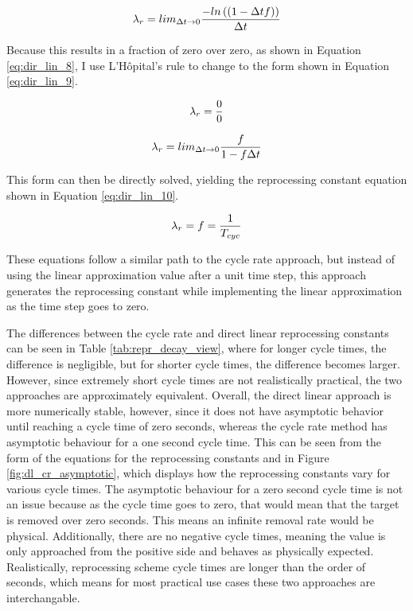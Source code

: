 \begin{equation} \hfill
\lambda_r = lim_{\Delta t \to 0} \frac{-ln\left((1 - \Delta t f)\right)}{\Delta t}
\hfill\label{eq:dir_lin_7} \end{equation}

Because this results in a fraction of zero over zero, as shown in Equation \eqref{eq:dir_lin_8}, I use L'Hôpital's rule to change to the form shown in Equation \eqref{eq:dir_lin_9}.

\begin{equation} \hfill
\lambda_r = \frac{0}{0}
\hfill\label{eq:dir_lin_8} \end{equation}

\begin{equation} \hfill
\lambda_r = lim_{\Delta t \to 0} \frac{f}{1-f\Delta t}
\hfill\label{eq:dir_lin_9} \end{equation}

This form can then be directly solved, yielding the reprocessing constant equation shown in Equation \eqref{eq:dir_lin_10}.

\begin{equation} \hfill
\lambda_r = f = \frac{1}{T_{cyc}}
\hfill\label{eq:dir_lin_10} \end{equation}

These equations follow a similar path to the cycle rate approach, but instead of using the linear approximation value after a unit time step, this approach generates the reprocessing constant while implementing the linear approximation as the time step goes to zero.

The differences between the cycle rate and direct linear reprocessing constants can be seen in Table \ref{tab:repr_decay_view}, where for longer cycle times, the difference is negligible, but for shorter cycle times, the difference becomes larger. However, since extremely short cycle times are not realistically practical, the two approaches are approximately equivalent. Overall, the direct linear approach is more numerically stable, however, since it does not have asymptotic behavior until reaching a cycle time of zero seconds, whereas the cycle rate method has asymptotic behaviour for a one second cycle time. This can be seen from the form of the equations for the reprocessing constants and in Figure \ref{fig:dl_cr_asymptotic}, which displays how the reprocessing constants vary for various cycle times. The asymptotic behaviour for a zero second cycle time is not an issue because as the cycle time goes to zero, that would mean that the target is removed over zero seconds. This means an infinite removal rate would be physical. Additionally, there are no negative cycle times, meaning the value is only approached from the positive side and behaves as physically expected. Realistically, reprocessing scheme cycle times are longer than the order of seconds, which means for most practical use cases these two approaches are interchangable.

